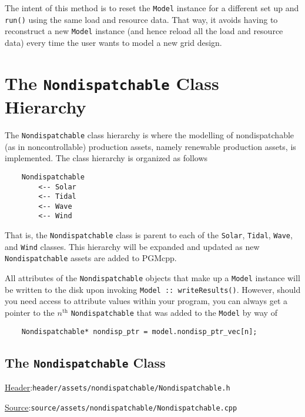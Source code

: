 \documentclass[12pt, letterpaper]{report}
\begin{document}
\noindent The intent of this method is to reset the \texttt{Model} instance for a different set up and \texttt{run()} using the same load and resource data. That way, it avoids having to reconstruct a new \texttt{Model} instance (and hence reload all the load and resource data) every time the user wants to model a new grid design.

\chapter{The \texttt{Nondispatchable} Class Hierarchy}

The \texttt{Nondispatchable} class hierarchy is where the modelling of nondispatchable (as in noncontrollable) production assets, namely renewable production assets, is implemented. The class hierarchy is organized as follows

\begin{verbatim}
    Nondispatchable
        <-- Solar
        <-- Tidal
        <-- Wave
        <-- Wind
\end{verbatim}

\noindent That is, the \texttt{Nondispatchable} class is parent to each of the \texttt{Solar}, \texttt{Tidal}, \texttt{Wave}, and \texttt{Wind} classes. This hierarchy will be expanded and updated as new \texttt{Nondispatchable} assets are added to PGMcpp.\par 
All attributes of the \texttt{Nondispatchable} objects that make up a \texttt{Model} instance will be written to the disk upon invoking \texttt{Model :: writeResults(\;\;)}. However, should you need access to attribute values within your program, you can always get a pointer to the $n^\textrm{th}$ \texttt{Nondispatchable} that was added to the \texttt{Model} by way of

\begin{verbatim}
    Nondispatchable* nondisp_ptr = model.nondisp_ptr_vec[n];
\end{verbatim}

\section{The \texttt{Nondispatchable} Class}

\begin{large}
\noindent\underline{Header}:\quad\texttt{header/assets/nondispatchable/Nondispatchable.h}\par
\noindent\underline{Source}:\quad\texttt{source/assets/nondispatchable/Nondispatchable.cpp}\par
\end{large}
\vspace{5mm}
\end{document}
